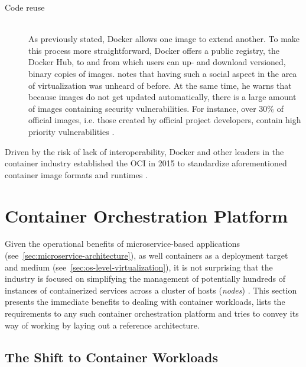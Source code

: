 \begin{description}
  \item[Code reuse]
  \hfill \\
  As previously stated, Docker allows one image to extend another. To make this process more straightforward, Docker offers a public registry, the Docker Hub, to and from which users can up- and download versioned, binary copies of images. \citeauthor{eder2016hypervisor} notes that having such a social aspect in the area of virtualization was unheard of before. At the same time, he warns that because images do not get updated automatically, there is a large amount of images containing security vulnerabilities. For instance, over 30\% of official images, i.e. those created by official project developers, contain high priority vulnerabilities \cite[pp.~6--7]{eder2016hypervisor}.
\end{description}

Driven by the risk of lack of interoperability, Docker and other leaders in the container industry established the \ac{OCI} in 2015 to standardize aforementioned container image formats and runtimes \cite[p.~23]{da2018containers}.


\section{Container Orchestration Platform}
\label{sec:container-orchestration-platform}

Given the operational benefits of microservice-based applications (see~\autoref{sec:microservice-architecture}), as well containers as a deployment target and medium (see~\autoref{sec:os-level-virtualization}), it is not surprising that the industry is focused on simplifying the management of potentially hundreds of instances of containerized services across a cluster of hosts (\textit{nodes}) \cite[p.~44]{khan2017key} \cite[p.~1]{pahl2017cloud}. This section presents the immediate benefits to dealing with container workloads, lists the requirements to any such container orchestration platform and tries to convey its way of working by laying out a reference architecture.


\subsection{The Shift to Container Workloads}
\label{sec:shift-to-container-workloads}

